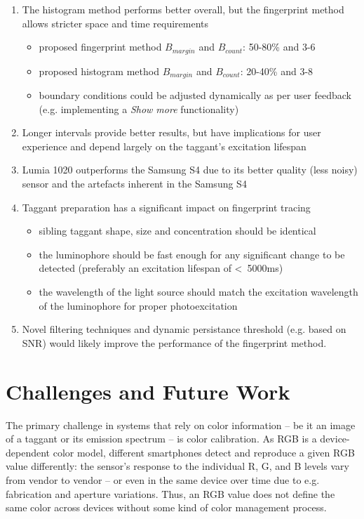 \documentclass[thesis.tex]{subfiles}
\begin{document}
\begin{enumerate}
  \item The histogram method performs better overall, but the fingerprint method allows stricter space and time requirements
    \begin{itemize}
      \item proposed fingerprint method $B_{margin}$ and $B_{count}$: 50-80\% and 3-6
      \item proposed histogram method $B_{margin}$ and $B_{count}$: 20-40\% and 3-8
      \item boundary conditions could be adjusted dynamically as per user feedback (e.g. implementing a \emph{Show more} functionality)
    \end{itemize}
  \item Longer intervals provide better results, but have implications for user experience and depend largely on the taggant's excitation lifespan
  \item Lumia 1020 outperforms the Samsung S4 due to its better quality (less noisy) sensor and the artefacts inherent in the Samsung S4
  \item Taggant preparation has a significant impact on fingerprint tracing
    \begin{itemize}
      \item sibling taggant shape, size and concentration should be identical
      \item the luminophore should be fast enough for any significant change to be detected (preferably an excitation lifespan of \textless\ 5000ms)
      \item the wavelength of the light source should match the excitation wavelength of the luminophore for proper photoexcitation
    \end{itemize}
  \item Novel filtering techniques and dynamic persistance threshold (e.g. based on SNR) would likely improve the performance of the fingerprint method.
\end{enumerate}

\section{Challenges and Future Work}

The primary challenge in systems that rely on color information -- be it an image of a taggant or its emission spectrum -- is color calibration. As RGB is a device-dependent color model, different smartphones detect and reproduce a given RGB value differently: the sensor's response to the individual R, G, and B levels vary from vendor to vendor -- or even in the same device over time due to e.g. fabrication and aperture variations. Thus, an RGB value does not define the same color across devices without some kind of color management process.
\end{document}
